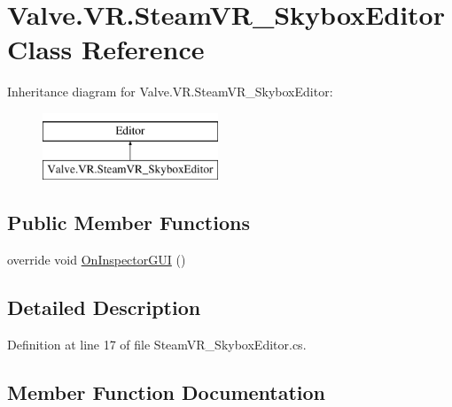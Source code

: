 \hypertarget{class_valve_1_1_v_r_1_1_steam_v_r___skybox_editor}{}\section{Valve.\+V\+R.\+Steam\+V\+R\+\_\+\+Skybox\+Editor Class Reference}
\label{class_valve_1_1_v_r_1_1_steam_v_r___skybox_editor}
Inheritance diagram for Valve.\+V\+R.\+Steam\+V\+R\+\_\+\+Skybox\+Editor\+:\begin{figure}[H]
\begin{center}
\leavevmode
\includegraphics[height=2.000000cm]{class_valve_1_1_v_r_1_1_steam_v_r___skybox_editor}
\end{center}
\end{figure}
\subsection*{Public Member Functions}
\begin{DoxyCompactItemize}
\item 
override void \mbox{\hyperlink{class_valve_1_1_v_r_1_1_steam_v_r___skybox_editor_a0f1f225778cc38c179782d00e74d0bf9}{On\+Inspector\+G\+UI}} ()
\end{DoxyCompactItemize}


\subsection{Detailed Description}


Definition at line 17 of file Steam\+V\+R\+\_\+\+Skybox\+Editor.\+cs.



\subsection{Member Function Documentation}
\mbox{\label{class_valve_1_1_v_r_1_1_steam_v_r___skybox_editor_a0f1f225778cc38c179782d00e74d0bf9}} 
